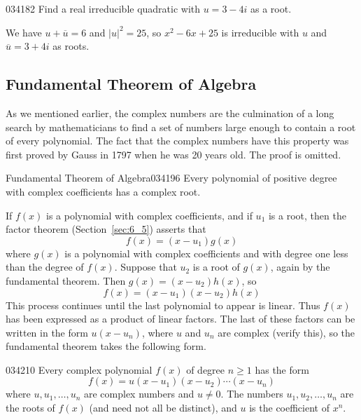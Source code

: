 \begin{example}{}{034182}
Find a real irreducible quadratic with $u = 3 - 4i$ as a root.


\begin{solution}
  We have $u + \overline{u} = 6$ and $|u|^{2} = 25$, so $x^{2} - 6x + 25$ is irreducible with $u$ and $\overline{u} = 3 + 4i$ as roots.
\end{solution}
\end{example}

\subsection*{Fundamental Theorem of Algebra}

As we mentioned earlier, the complex 
numbers are the culmination of a long search by mathematicians to find a
 set of numbers large enough to contain a root of every polynomial. The 
fact that the complex numbers have this property was first proved by 
Gauss in 1797 when he was 20 years old. The proof is omitted.


\begin{theorem}{Fundamental Theorem of Algebra}{034196}
Every polynomial of positive degree with complex coefficients has a complex root.
\end{theorem}

\noindent If $f(x)$ is a polynomial with complex coefficients, and if $u_{1}$ is a root, then the factor theorem (Section~\ref{sec:6_5}) asserts that
\begin{equation*}
f(x) = (x-u_1)g(x)
\end{equation*}
where $g(x)$ is a polynomial with complex coefficients and with degree one less than the degree of $f(x)$. Suppose that $u_{2}$ is a root of $g(x)$, again by the fundamental theorem. Then $g(x) = (x - u_{2})h(x)$, so
\begin{equation*}
f(x) = (x-u_1)(x-u_2)h(x)
\end{equation*}
This process continues until the last polynomial to appear is linear. Thus $f(x)$ has been expressed as a product of linear factors. The last of these factors can be written in the form $u(x - u_{n})$, where $u$ and $u_{n}$ are complex (verify this), so the fundamental theorem takes the following form.


\begin{theorem}{}{034210}
Every complex polynomial $f(x)$ of degree $n \geq 1$ has the form
\begin{equation*}
f(x) = u(x-u_1)(x-u_2)\cdots (x-u_n)
\end{equation*}
where $u, u_{1}, \dots, u_{n}$ are complex numbers and $u \neq 0$. The numbers $u_{1}, u_{2}, \dots, u_{n}$ are the roots of $f(x)$ (and need not all be distinct), and $u$ is the coefficient of $x^{n}$.
\end{theorem}

